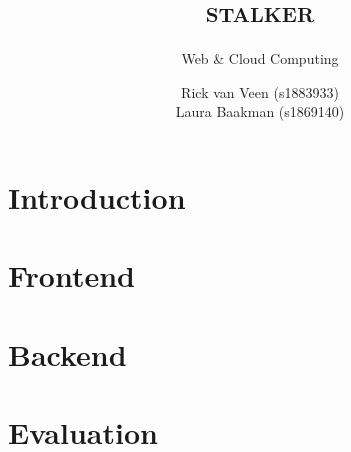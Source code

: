 \documentclass{report}
\title{\textsc{stalker}}
\subtitle{Web \& Cloud Computing}
\author{Rick van Veen (s1883933)\\Laura Baakman (s1869140)}
\begin{document}
\maketitle

\chapter*{Introduction}
\label{ch:intro}


\chapter{Frontend}
\label{ch:frontend}
% 

\chapter{Backend}
\label{ch:backend}
% 

\chapter{Evaluation}
\label{ch:eval}
% 
\end{document}
